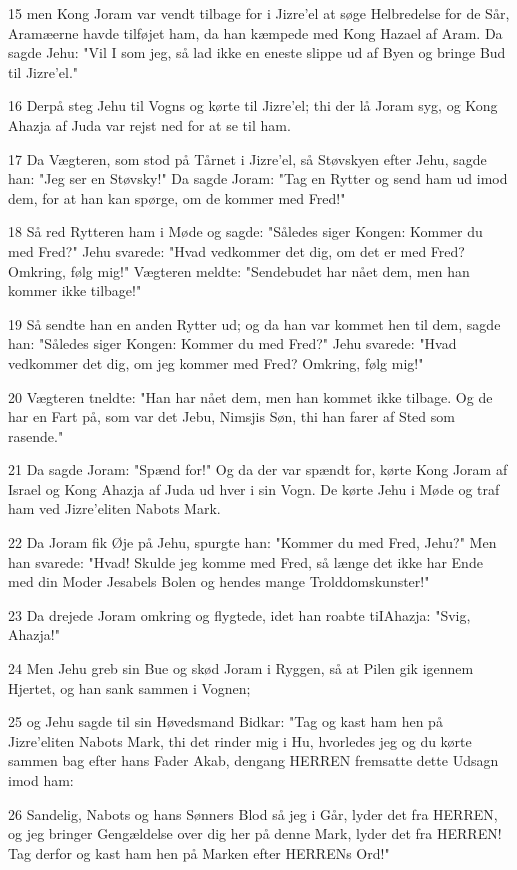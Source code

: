 \par 15 men Kong Joram var vendt tilbage for i Jizre'el at søge Helbredelse for de Sår, Aramæerne havde tilføjet ham, da han kæmpede med Kong Hazael af Aram. Da sagde Jehu: "Vil I som jeg, så lad ikke en eneste slippe ud af Byen og bringe Bud til Jizre'el."
\par 16 Derpå steg Jehu til Vogns og kørte til Jizre'el; thi der lå Joram syg, og Kong Ahazja af Juda var rejst ned for at se til ham.
\par 17 Da Vægteren, som stod på Tårnet i Jizre'el, så Støvskyen efter Jehu, sagde han: "Jeg ser en Støvsky!" Da sagde Joram: "Tag en Rytter og send ham ud imod dem, for at han kan spørge, om de kommer med Fred!"
\par 18 Så red Rytteren ham i Møde og sagde: "Således siger Kongen: Kommer du med Fred?" Jehu svarede: "Hvad vedkommer det dig, om det er med Fred? Omkring, følg mig!" Vægteren meldte: "Sendebudet har nået dem, men han kommer ikke tilbage!"
\par 19 Så sendte han en anden Rytter ud; og da han var kommet hen til dem, sagde han: "Således siger Kongen: Kommer du med Fred?" Jehu svarede: "Hvad vedkommer det dig, om jeg kommer med Fred? Omkring, følg mig!"
\par 20 Vægteren tneldte: "Han har nået dem, men han kommet ikke tilbage. Og de har en Fart på, som var det Jebu, Nimsjis Søn, thi han farer af Sted som rasende."
\par 21 Da sagde Joram: "Spænd for!" Og da der var spændt for, kørte Kong Joram af Israel og Kong Ahazja af Juda ud hver i sin Vogn. De kørte Jehu i Møde og traf ham ved Jizre'eliten Nabots Mark.
\par 22 Da Joram fik Øje på Jehu, spurgte han: "Kommer du med Fred, Jehu?" Men han svarede: "Hvad! Skulde jeg komme med Fred, så længe det ikke har Ende med din Moder Jesabels Bolen og hendes mange Trolddomskunster!"
\par 23 Da drejede Joram omkring og flygtede, idet han roabte tiIAhazja: "Svig, Ahazja!"
\par 24 Men Jehu greb sin Bue og skød Joram i Ryggen, så at Pilen gik igennem Hjertet, og han sank sammen i Vognen;
\par 25 og Jehu sagde til sin Høvedsmand Bidkar: "Tag og kast ham hen på Jizre'eliten Nabots Mark, thi det rinder mig i Hu, hvorledes jeg og du kørte sammen bag efter hans Fader Akab, dengang HERREN fremsatte dette Udsagn imod ham:
\par 26 Sandelig, Nabots og hans Sønners Blod så jeg i Går, lyder det fra HERREN, og jeg bringer Gengældelse over dig her på denne Mark, lyder det fra HERREN! Tag derfor og kast ham hen på Marken efter HERRENs Ord!"
